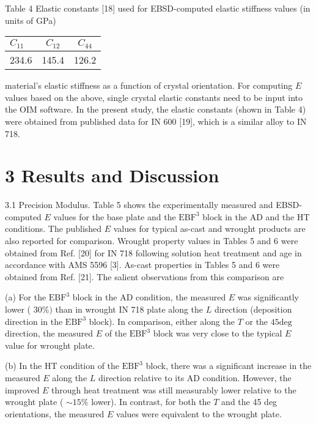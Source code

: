 \documentclass[10pt]{article}
\begin{document}
Table 4 Elastic constants [18] used for EBSD-computed elastic stiffness values (in units of GPa)

\begin{center}
\begin{tabular}{lcc}
\hline\hline
$C_{11}$ & $C_{12}$ & $C_{44}$ \\
\hline
234.6 & 145.4 & 126.2 \\
\hline
\end{tabular}
\end{center}

material's elastic stiffness as a function of crystal orientation. For computing $E$ values based on the above, single crystal elastic constants need to be input into the OIM software. In the present study, the elastic constants (shown in Table 4) were obtained from published data for IN 600 [19], which is a similar alloy to IN 718.

\section*{3 Results and Discussion}
3.1 Precision Modulus. Table 5 shows the experimentally measured and EBSD-computed $E$ values for the base plate and the $\mathrm{EBF}^{3}$ block in the $\mathrm{AD}$ and the HT conditions. The published $E$ values for typical as-cast and wrought products are also reported for comparison. Wrought property values in Tables 5 and 6 were obtained from Ref. [20] for IN 718 following solution heat treatment and age in accordance with AMS 5596 [3]. As-cast properties in Tables 5 and 6 were obtained from Ref. [21]. The salient observations from this comparison are

(a) For the $\mathrm{EBF}^{3}$ block in the $\mathrm{AD}$ condition, the measured $E$ was significantly lower ( $30 \%)$ than in wrought IN 718 plate along the $L$ direction (deposition direction in the $\mathrm{EBF}^{3}$ block). In comparison, either along the $T$ or the $45 \mathrm{deg}$ direction, the measured $E$ of the $\mathrm{EBF}^{3}$ block was very close to the typical $E$ value for wrought plate.

(b) In the HT condition of the $\mathrm{EBF}^{3}$ block, there was a significant increase in the measured $E$ along the $L$ direction relative to its AD condition. However, the improved $E$ through heat treatment was still measurably lower relative to the wrought plate ( $\sim 15 \%$ lower). In contrast, for both the $T$ and the 45 deg orientations, the measured $E$ values were equivalent to the wrought plate.
\end{document}
